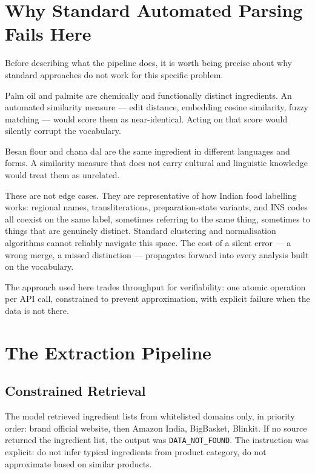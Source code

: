 \documentclass[
  letterpaper,
  DIV=11,
  numbers=noendperiod]{scrartcl}
\begin{document}
\section{Why Standard Automated Parsing Fails
Here}\label{why-standard-automated-parsing-fails-here}

Before describing what the pipeline does, it is worth being precise
about why standard approaches do not work for this specific problem.

Palm oil and palmite are chemically and functionally distinct
ingredients. An automated similarity measure --- edit distance,
embedding cosine similarity, fuzzy matching --- would score them as
near-identical. Acting on that score would silently corrupt the
vocabulary.

Besan flour and chana dal are the same ingredient in different languages
and forms. A similarity measure that does not carry cultural and
linguistic knowledge would treat them as unrelated.

These are not edge cases. They are representative of how Indian food
labelling works: regional names, transliterations, preparation-state
variants, and INS codes all coexist on the same label, sometimes
referring to the same thing, sometimes to things that are genuinely
distinct. Standard clustering and normalisation algorithms cannot
reliably navigate this space. The cost of a silent error --- a wrong
merge, a missed distinction --- propagates forward into every analysis
built on the vocabulary.

The approach used here trades throughput for verifiability: one atomic
operation per API call, constrained to prevent approximation, with
explicit failure when the data is not there.

\section{The Extraction Pipeline}\label{the-extraction-pipeline}

\subsection{Constrained Retrieval}\label{constrained-retrieval}

The model retrieved ingredient lists from whitelisted domains only, in
priority order: brand official website, then Amazon India, BigBasket,
Blinkit. If no source returned the ingredient list, the output was
\texttt{DATA\_NOT\_FOUND}. The instruction was explicit: do not infer
typical ingredients from product category, do not approximate based on
similar products.
\end{document}
